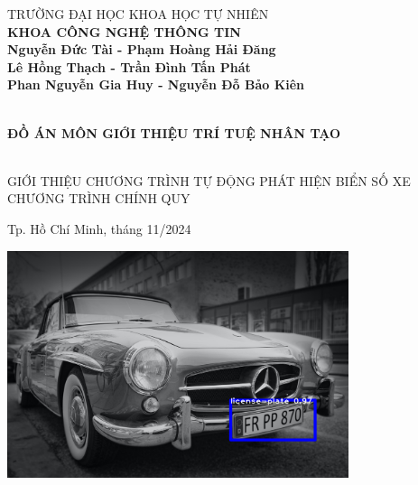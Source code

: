 \documentclass{article}
\begin{document}
\begin{titlepage}

\begin{center}

TRƯỜNG ĐẠI HỌC KHOA HỌC TỰ NHIÊN\\
\textbf{KHOA CÔNG NGHỆ THÔNG TIN}\\[2cm]

{ \large \bfseries Nguyễn Đức Tài - Phạm Hoàng Hải Đăng\\ Lê Hồng Thạch - Trần Đình Tấn Phát\\ Phan Nguyễn Gia Huy - Nguyễn Đỗ Bảo Kiên\\[2cm] } 


{ \large \bfseries ĐỒ ÁN MÔN GIỚI THIỆU TRÍ TUỆ NHÂN TẠO \\[3cm]} 


\large GIỚI THIỆU CHƯƠNG TRÌNH TỰ ĐỘNG PHÁT HIỆN BIỂN SỐ XE\\

\large CHƯƠNG TRÌNH CHÍNH QUY\\


\vfill
Tp. Hồ Chí Minh, tháng 11/2024

\end{center}

\pagebreak
\end{titlepage}
\maketitle
\includegraphics[width=10cm]{img/img1/Notebook1.png}

\tableofcontents
\end{document}
